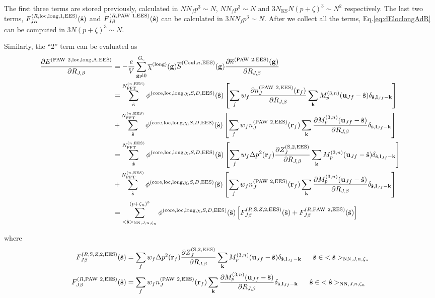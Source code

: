 \documentclass[paper=a4, fontsize=11pt]{article} %
\numberwithin{equation}{section} %
\numberwithin{figure}{section} %
\numberwithin{table}{section} %
\newcommand{\p}{\partial}
\newcommand{\ol}{\overline}
\newcommand{\bu}{{\bf{u}}}
\newcommand{\bl}{{\bf{l}}}
\newcommand{\bk}{{\bf{k}}}
\newcommand{\bs}{{\bf{s}}}
\newcommand{\bg}{{\bf{g}}}
\newcommand{\br}{{\bf{r}}}
\newcommand{\hs}{{\hat{\bf{s}}}}
\newcommand{\rS}{{\mathrm{S}}}
\newcommand{\rEES}{{\mathrm{EES}}}
\newcommand{\rcore}{{\mathrm{core}}}
\newcommand{\rNN}{{\mathrm{NN}}}
\newcommand{\rCo}{{\mathrm{Coul}}}
\newcommand{\rlong}{{\mathrm{long}}}
\newcommand{\rP}{{\mathrm{PAW}}}
\newcommand{\rA}{{\mathrm{A}}}
\newcommand{\rlo}{{\mathrm{loc}}}
\newcommand{\al}{{\alpha}}
\newcommand{\RJb}{{R_{J,\beta}}}
\newcommand{\NKS}{{N_{\mathrm{KS}}}}
\newcommand{\NFFTnEES}{{N^{(n,\rEES)}_{\mathrm{FFT}}}}
\newcommand{\Gc}{{G_{\mathrm{c}}}}
\newcommand{\Mn}{{M_p^{(3,n)}}}
\newcommand{\pz}{{(p+\zeta)^3}}
\newcommand{\pzn}{{(p+\zeta_n)^3}}
\newcommand{\hsJn}{{<\hs>_{\rNN,J,n,\zeta_n}}}
\newcommand{\hsinJn}{{\ \ \ \ \ \hs  \in  \hsJn}}
\begin{document}
The first three terms are stored previously, calculated in $NN_f p^3 \sim N$, $N N_f p^3 \sim N$ and $3\NKS N \pz \sim N^2$ respectively. The last two terms, $F_{J\al}^{(R,\rlo,\rlong,1,\rEES)}(\hat \bs)$ and $F_{J\beta}^{(R,\rP\ 1,\rEES)}(\hs)$ can be calculated in $3 N N_f p^3 \sim N$. After we collect all the terms, Eq.\eqref{eq:dEloclongAdR} can be computed in $3N \pz \sim N$.


Similarly, the ``2'' term can be evaluated as
\begin{equation} \label{eq:dEloclong2dR}
\begin{split}
\frac{\p E^{(\rP\ 2,\rlo,\rlong,\rA,\rEES)}}{\p \RJb}
&= -\frac{e}{V} \sum_{\bg \neq 0}^{\Gc} \ol \chi^{(\rlong)}(\bg) \ol S^{(\rCo,n,\rEES)}(\bg) \frac{\p \ol n^{(\rP\ 2,\rEES)}(\bg)}{\p \RJb}\\
&= \sum_{\hat \bs}^{\NFFTnEES} \phi^{(\rcore,\rlo,\rlong,\chi,S,D,\rEES)}(\hs) \left[\sum_f w_f  \frac{\p n_J^{(\rP\ 2,\rEES)}(\br_f)}{\p \RJb} \sum_{\bk}  \Mn(\bu_{Jf}-\hat \bs)\delta_{\hat \bs,\bl_{Jf}-\bk}\right] \\
&+ \sum_{\hat \bs}^{\NFFTnEES} \phi^{(\rcore,\rlo,\rlong,\chi,S,D,\rEES)}(\hs) \left[\sum_f w_f  n_J^{(\rP\ 2,\rEES)}(\br_f) \sum_{\bk}  \frac{\p \Mn(\bu_{Jf}-\hat \bs)}{\p \RJb}\delta_{\hat \bs,\bl_{Jf}-\bk}\right] \\
&= \sum_{\hat \bs}^{\NFFTnEES} \phi^{(\rcore,\rlo,\rlong,\chi,S,D,\rEES)}(\hs) \left[\sum_f w_f  \Delta p^2(\br_f)\frac{\p Z_{J}^{(\rS,2,\rEES)}}{\p \RJb} \sum_{\bk}  \Mn(\bu_{Jf}-\hat \bs)\delta_{\hat \bs,\bl_{Jf}-\bk}\right] \\
&+ \sum_{\hat \bs}^{\NFFTnEES} \phi^{(\rcore,\rlo,\rlong,\chi,S,D,\rEES)}(\hs) \left[\sum_f w_f  n_J^{(\rP\ 2,\rEES)}(\br_f) \sum_{\bk}  \frac{\p \Mn(\bu_{Jf}-\hat \bs)}{\p \RJb}\delta_{\hat \bs,\bl_{Jf}-\bk}\right] \\
&= \sum_{\hsJn}^{\pzn} \phi^{(\rcore,\rlo,\rlong,\chi,S,D,\rEES)}(\hs)  \left[F_{J\beta}^{(R,\rS,Z,2,\rEES)}(\hs)+ F_{J\beta}^{(R,\rP\ 2,\rEES)}(\hs)\right]\\
\end{split}
\end{equation}


where
\begin{equation}
\begin{split}
F_{J\beta}^{(R,\rS,Z,2,\rEES)}(\hs) &= \sum_f w_f  \Delta p^2(\br_f)\frac{\p Z_{J}^{(\rS,2,\rEES)}}{\p \RJb} \sum_{\bk}  \Mn(\bu_{Jf}-\hat \bs)\delta_{\hat \bs,\bl_{Jf}-\bk} \hsinJn \\
F_{J\beta}^{(R,\rP\ 2,\rEES)}(\hs) &= \sum_f w_f  n_J^{(\rP\ 2,\rEES)}(\br_f) \sum_{\bk}  \frac{\p \Mn(\bu_{Jf}-\hat \bs)}{\p \RJb}\delta_{\hat \bs,\bl_{Jf}-\bk}\hsinJn\\
\end{split}
\end{equation}
\end{document}
